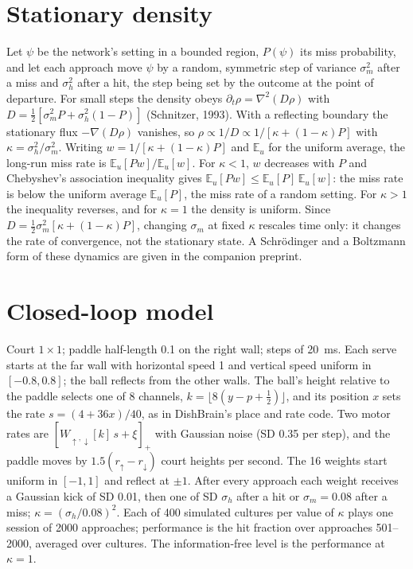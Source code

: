 \documentclass[11pt]{article}
\begin{document}
\section*{Stationary density}
Let $\psi$ be the network's setting in a bounded region, $P(\psi)$ its miss probability, and let each approach move $\psi$ by a random, symmetric step of variance $\sigma_m^2$ after a miss and $\sigma_h^2$ after a hit, the step being set by the outcome at the point of departure. For small steps the density obeys $\partial_t\rho=\nabla^2(D\rho)$ with $D=\tfrac12[\sigma_m^2P+\sigma_h^2(1-P)]$ (Schnitzer, 1993). With a reflecting boundary the stationary flux $-\nabla(D\rho)$ vanishes, so $\rho\propto1/D\propto1/[\kappa+(1-\kappa)P]$ with $\kappa=\sigma_h^2/\sigma_m^2$. Writing $w=1/[\kappa+(1-\kappa)P]$ and $\mathbb{E}_u$ for the uniform average, the long-run miss rate is $\mathbb{E}_u[Pw]/\mathbb{E}_u[w]$. For $\kappa<1$, $w$ decreases with $P$ and Chebyshev's association inequality gives $\mathbb{E}_u[Pw]\le\mathbb{E}_u[P]\,\mathbb{E}_u[w]$: the miss rate is below the uniform average $\mathbb{E}_u[P]$, the miss rate of a random setting. For $\kappa>1$ the inequality reverses, and for $\kappa=1$ the density is uniform. Since $D=\tfrac12\sigma_m^2[\kappa+(1-\kappa)P]$, changing $\sigma_m$ at fixed $\kappa$ rescales time only: it changes the rate of convergence, not the stationary state. A Schr\"odinger and a Boltzmann form of these dynamics are given in the companion preprint.

\section*{Closed-loop model}
Court $1\times1$; paddle half-length 0.1 on the right wall; steps of 20~ms. Each serve starts at the far wall with horizontal speed 1 and vertical speed uniform in $[-0.8,0.8]$; the ball reflects from the other walls. The ball's height relative to the paddle selects one of 8 channels, $k=\lfloor8(y-p+\tfrac12)\rfloor$, and its position $x$ sets the rate $s=(4+36x)/40$, as in DishBrain's place and rate code. Two motor rates are $[W_{\uparrow,\downarrow}[k]\,s+\xi]_+$ with Gaussian noise (SD 0.35 per step), and the paddle moves by $1.5(r_\uparrow-r_\downarrow)$ court heights per second. The 16 weights start uniform in $[-1,1]$ and reflect at $\pm1$. After every approach each weight receives a Gaussian kick of SD 0.01, then one of SD $\sigma_h$ after a hit or $\sigma_m=0.08$ after a miss; $\kappa=(\sigma_h/0.08)^2$. Each of 400 simulated cultures per value of $\kappa$ plays one session of 2000 approaches; performance is the hit fraction over approaches 501--2000, averaged over cultures. The information-free level is the performance at $\kappa=1$.
\end{document}
